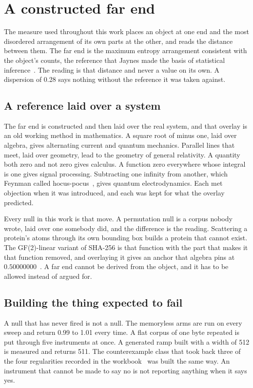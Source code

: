 \chapter{A constructed far end}

The measure used throughout this work places an object at one end and the most disordered
arrangement of its own parts at the other, and reads the distance between them. The far end is the
maximum entropy arrangement consistent with the object's counts, the reference that Jaynes made the
basis of statistical inference~\cite{src:Jaynes}. The reading is that distance and never a value on its
own. A dispersion of 0.28 says nothing without the reference it was taken against.

\section{A reference laid over a system}

The far end is constructed and then laid over the real system, and that overlay is an old working
method in mathematics. A square root of minus one, laid over algebra, gives alternating current and
quantum mechanics. Parallel lines that meet, laid over geometry, lead to the geometry of general
relativity. A quantity both zero and not zero gives calculus. A function zero everywhere whose
integral is one gives signal processing. Subtracting one infinity from another, which Feynman called
hocus-pocus~\cite{src:Feynman-1985}, gives quantum electrodynamics. Each met objection when it was
introduced, and each was kept for what the overlay predicted.

Every null in this work is that move. A permutation null is a corpus nobody wrote, laid over one
somebody did, and the difference is the reading. Scattering a protein's atoms through its own bounding
box builds a protein that cannot exist. The GF(2)-linear variant of SHA-256 is that function with the
part that makes it that function removed, and overlaying it gives an anchor that algebra pins at
\(0.50000000\)~\cite{src:Quigg-sha256}. A far end cannot be derived from the object, and it has to be
allowed instead of argued for.

\section{Building the thing expected to fail}

A null that has never fired is not a null. The memoryless arms are run on every sweep and return 0.99
to 1.01 every time. A flat corpus of one byte repeated is put through five instruments at once. A
generated ramp built with a width of 512 is measured and returns 511. The counterexample class that
took back three of the four regularities recorded in the workbook~\cite{src:Quigg-orior-workbook} was
built the same way. An instrument that cannot be made to say no is not reporting anything when it says
yes.

